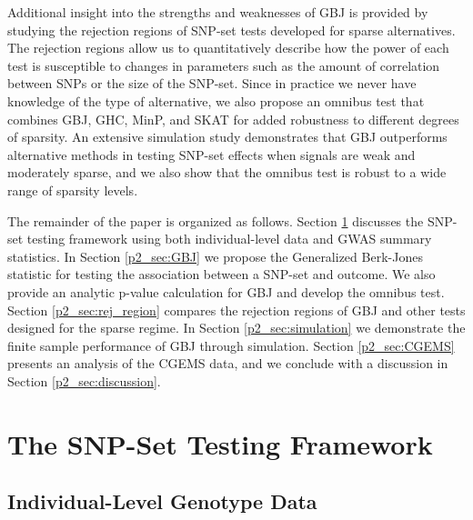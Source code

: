 \documentclass[12pt]{article}
\begin{document}
Additional insight into the strengths and weaknesses of GBJ is provided by studying 
the rejection regions of SNP-set tests developed for sparse alternatives.
The rejection regions allow us to quantitatively describe how the power of each test is 
susceptible to changes in parameters such as the  amount of correlation between 
SNPs or the size of the SNP-set.
Since in practice we never have knowledge of the type of alternative, we also 
propose an omnibus test that combines GBJ, GHC, MinP, and SKAT for added 
robustness to different degrees of sparsity.
An extensive simulation study demonstrates that GBJ outperforms alternative 
methods in testing SNP-set effects when signals are weak and moderately sparse, 
and we also show that the omnibus test is robust to a wide range of sparsity levels.

The remainder of the paper is organized as follows. 
Section \ref{p2_sec:framework} discusses the SNP-set testing framework using both individual-level data 
and GWAS summary statistics. 
In Section \ref{p2_sec:GBJ} we propose the Generalized Berk-Jones statistic for testing the association 
between a SNP-set and outcome.  
We also provide an analytic p-value calculation for GBJ and develop the omnibus test.
Section \ref{p2_sec:rej_region} compares the rejection regions of GBJ and other tests designed for the sparse regime. 
In Section \ref{p2_sec:simulation} we demonstrate the finite sample performance of GBJ through simulation.
Section \ref{p2_sec:CGEMS} presents an analysis of the CGEMS data, and we conclude with a 
discussion in Section \ref{p2_sec:discussion}.


\section{The SNP-Set Testing Framework}
\label{p2_sec:framework}

\subsection{Individual-Level Genotype Data}
\label{p2_ss:IL_framework}
\end{document}

